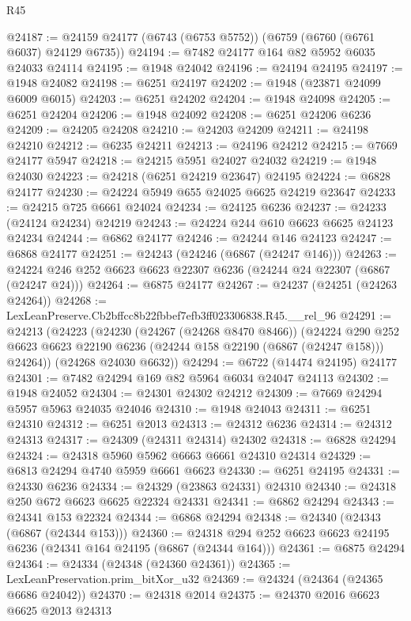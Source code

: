 \begin{lexlean}{R45}
\begin{coremodule}
{@24187 := @24159 @24177 (@6743 (@6753 @5752)) (@6759 (@6760 (@6761 @6037) @24129 @6735))
@24194 := @7482 @24177 @164 @82 @5952 @6035 @24033 @24114
@24195 := @1948 @24042
@24196 := @24194 @24195
@24197 := @1948 @24082
@24198 := @6251 @24197
@24202 := @1948 (@23871 @24099 @6009 @6015)
@24203 := @6251 @24202
@24204 := @1948 @24098
@24205 := @6251 @24204
@24206 := @1948 @24092
@24208 := @6251 @24206 @6236
@24209 := @24205 @24208
@24210 := @24203 @24209
@24211 := @24198 @24210
@24212 := @6235 @24211
@24213 := @24196 @24212
@24215 := @7669 @24177 @5947
@24218 := @24215 @5951 @24027 @24032
@24219 := @1948 @24030
@24223 := @24218 (@6251 @24219 @23647) @24195
@24224 := @6828 @24177
@24230 := @24224 @5949 @655 @24025 @6625 @24219 @23647
@24233 := @24215 @725 @6661 @24024
@24234 := @24125 @6236
@24237 := @24233 (@24124 @24234) @24219
@24243 := @24224 @244 @610 @6623 @6625 @24123 @24234
@24244 := @6862 @24177
@24246 := @24244 @146 @24123
@24247 := @6868 @24177
@24251 := @24243 (@24246 (@6867 (@24247 @146)))
@24263 := @24224 @246 @252 @6623 @6623 @22307 @6236 (@24244 @24 @22307 (@6867 (@24247 @24)))
@24264 := @6875 @24177
@24267 := @24237 (@24251 (@24263 @24264))
@24268 := LexLeanPreserve.Cb2bffcc8b22fbbef7efb3ff023306838.R45.__rel_96
@24291 := @24213
    (@24223
      (@24230
        (@24267 (@24268 @8470 @8466))
        (@24224
          @290
          @252
          @6623
          @6623
          @22190
          @6236
          (@24244 @158 @22190 (@6867 (@24247 @158)))
          @24264))
      (@24268 @24030 @6632))
@24294 := @6722 (@14474 @24195) @24177
@24301 := @7482 @24294 @169 @82 @5964 @6034 @24047 @24113
@24302 := @1948 @24052
@24304 := @24301 @24302 @24212
@24309 := @7669 @24294 @5957 @5963 @24035 @24046
@24310 := @1948 @24043
@24311 := @6251 @24310
@24312 := @6251 @2013
@24313 := @24312 @6236
@24314 := @24312 @24313
@24317 := @24309 (@24311 @24314) @24302
@24318 := @6828 @24294
@24324 := @24318 @5960 @5962 @6663 @6661 @24310 @24314
@24329 := @6813 @24294 @4740 @5959 @6661 @6623
@24330 := @6251 @24195
@24331 := @24330 @6236
@24334 := @24329 (@23863 @24331) @24310
@24340 := @24318 @250 @672 @6623 @6625 @22324 @24331
@24341 := @6862 @24294
@24343 := @24341 @153 @22324
@24344 := @6868 @24294
@24348 := @24340 (@24343 (@6867 (@24344 @153)))
@24360 := @24318 @294 @252 @6623 @6623 @24195 @6236 (@24341 @164 @24195 (@6867 (@24344 @164)))
@24361 := @6875 @24294
@24364 := @24334 (@24348 (@24360 @24361))
@24365 := LexLeanPreservation.prim_bitXor_u32
@24369 := @24324 (@24364 (@24365 @6686 @24042))
@24370 := @24318 @2014
@24375 := @24370 @2016 @6623 @6625 @2013 @24313
}
\end{coremodule}
\end{lexlean}
